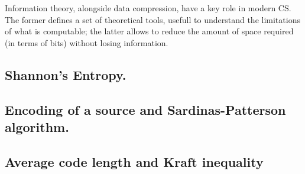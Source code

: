 \documentclass{subfiles}
\begin{document}
    Information theory, alongside data compression,
        have a key role in modern CS. 
        The former defines a set of theoretical tools,
        usefull to understand the limitations of what is computable;
        the latter allows to reduce the amount of space required (in terms of bits)
        without losing information.

    \subsection{Shannon's Entropy.}\label{Sec:1.1}
    

    \subsection{Encoding of a source and Sardinas-Patterson algorithm.}
    

    \subsection{Average code length and Kraft inequality}
    
\end{document}
